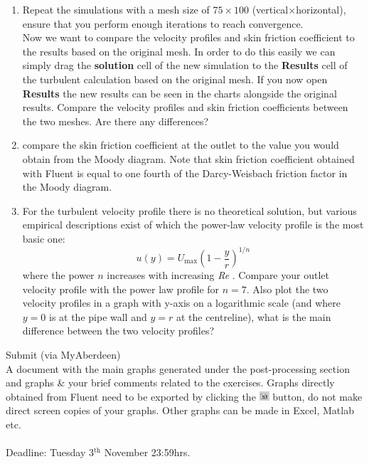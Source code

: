 \documentclass[11pt,a4paper,oneside]{scrartcl}
\newcommand\Rey{\mbox{\textit{Re}}\,\,}
\newcommand\bfr[1]{\textcolor[rgb]{1,0.00,0.00}{\textbf{\textsf{#1}}}}
\begin{document}
\begin{enumerate}
\item Repeat the simulations with a mesh size of $75\times100$ (vertical$\times$horizontal), ensure that you perform enough iterations to reach convergence.\\
Now we want to compare the velocity profiles and skin friction coefficient to the results based on the original mesh. In order to do this easily we can simply drag the \bfr{solution} cell of the new simulation to the \bfr{Results} cell of the turbulent calculation based on the original mesh. If you now open \bfr{Results} the new results can be seen in the charts alongside the original results. Compare the velocity profiles and skin friction coefficients between the two meshes. Are there any differences?
\item compare the skin friction coefficient at the outlet to the value you would obtain from the Moody diagram. Note that skin friction coefficient obtained with Fluent is equal to one fourth of the Darcy-Weisbach friction factor in the Moody diagram.
\item For the turbulent velocity profile there is no theoretical solution, but various empirical descriptions exist of which the power-law velocity profile is the most basic one:
    \begin{equation}
        u(y)=U_\mathrm{max}\left(1-\frac{y}{r}\right)^{1/n}
    \end{equation}
    where the power $n$ increases with increasing \Rey. Compare your outlet velocity profile with the power law profile for $n=7$. Also plot the two velocity profiles in a graph with y-axis on a logarithmic scale (and where $y=0$ is at the pipe wall and $y=r$ at the centreline), what is the main difference between the two velocity profiles?
\end{enumerate}

\vspace{3cm}

Submit (via MyAberdeen)\\
A document with the main graphs generated under the post-processing section and graphs \& your brief comments related to the exercises. Graphs directly obtained from Fluent need to be exported by clicking the \includegraphics[width=.4cm]{export_fig_icon.png} button, do not make direct screen copies of your graphs. Other graphs can be made in Excel, Matlab etc.
\\
\\
Deadline: Tuesday 3$^\mathrm{th}$ November 23:59hrs.
\end{document}
